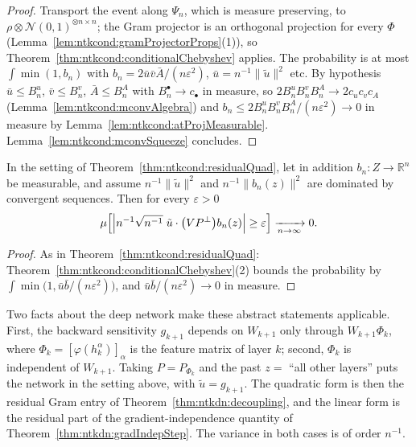 \begin{proof}
  \leanok
Transport the event along $\Psi_n$, which is measure preserving, to $\rho\otimes\mathcal N(0,1)^{\otimes n\times n}$; the Gram projector is an orthogonal projection for every $\Phi$ (Lemma~\ref{lem:ntkcond:gramProjectorProps}(1)), so Theorem~\ref{thm:ntkcond:conditionalChebyshev} applies. The probability is at most $\int\min(1,b_n)$ with $b_n=2\bar u\bar v\bar A/(n\varepsilon^2)$, $\bar u=n^{-1}\|\tilde u\|^2$ etc. By hypothesis $\bar u\le B^u_n$, $\bar v\le B^v_n$, $\bar A\le B^A_n$ with $B^\bullet_n\to c_\bullet$ in measure, so $2B^u_nB^v_nB^A_n\to2c_uc_vc_A$ (Lemma~\ref{lem:ntkcond:mconvAlgebra}) and $b_n\le2B^u_nB^v_nB^A_n/(n\varepsilon^2)\to0$ in measure by Lemma~\ref{lem:ntkcond:atProjMeasurable}. Lemma~\ref{lem:ntkcond:mconvSqueeze} concludes.
\end{proof}

\begin{theorem}\label{thm:ntkcond:residualLinear}
  \leanok
In the setting of Theorem~\ref{thm:ntkcond:residualQuad}, let in addition $b_n:Z\to\mathbb R^n$ be measurable, and assume $n^{-1}\|\tilde u\|^2$ and $n^{-1}\|b_n(z)\|^2$ are dominated by convergent sequences. Then for every $\varepsilon>0$
\[
  \mu\Bigl[\Bigl|n^{-1}\sqrt{n^{-1}}\;\tilde u\cdot\bigl(VP^\perp\bigr)b_n(z)\Bigr|\ge\varepsilon\Bigr]\xrightarrow[n\to\infty]{}0 .
\]
\end{theorem}

\begin{proof}
  \leanok
As in Theorem~\ref{thm:ntkcond:residualQuad}: Theorem~\ref{thm:ntkcond:conditionalChebyshev}(2) bounds the probability by $\int\min\bigl(1,\bar u\bar b/(n\varepsilon^2)\bigr)$, and $\bar u\bar b/(n\varepsilon^2)\to0$ in measure.
\end{proof}

\begin{remark}\label{rmk:ntkcond:residualRole}
Two facts about the deep network make these abstract statements applicable. First, the backward sensitivity $g_{k+1}$ depends on $W_{k+1}$ only through $W_{k+1}\Phi_k$, where $\Phi_k=[\varphi(h_k^\alpha)]_\alpha$ is the feature matrix of layer $k$; second, $\Phi_k$ is independent of $W_{k+1}$. Taking $P=P_{\Phi_k}$ and the past $z=$ ``all other layers'' puts the network in the setting above, with $\tilde u=g_{k+1}$. The quadratic form is then the residual Gram entry of Theorem~\ref{thm:ntkdn:decoupling}, and the linear form is the residual part of the gradient-independence quantity of Theorem~\ref{thm:ntkdn:gradIndepStep}. The variance in both cases is of order $n^{-1}$.
\end{remark}


